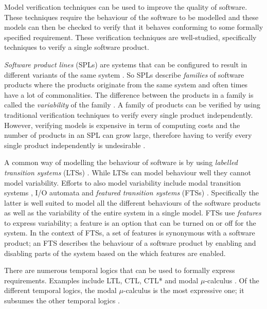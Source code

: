 Model verification techniques can be used to improve the quality of software. These techniques require the behaviour of the software to be modelled and these models can then be checked to verify that it behaves conforming to some formally specified requirement. These verification techniques are well-studied, specifically techniques to verify a single software product.

\textit{Software product lines} (SPLs) are systems that can be configured to result in different variants of the same system \cite{ClementsSoftwareProduct2001,SPLsFoundationAndTechniques}. So SPLs describe \textit{families} of software products where the products originate from the same system and often times have a lot of commonalities. The difference between the products in a family is called the \textit{variability} of the family \cite{OnTheNotionOfVariability}. A family of products can be verified by using traditional verification techniques to verify every single product independently. However, verifying models is expensive in term of computing costs and the number of products in an SPL can grow large, therefore having to verify every single product independently is undesirable \cite{CheckingLotsOfSystems}.

A common way of modelling the behaviour of software is by using \textit{labelled transition systems} (LTSs) \cite{Groote}. While LTSs can model behaviour well they cannot model variability. Efforts to also model variability include  modal transition systems \cite{ModalTS1,ModalTS2,ModalTS3}, I/O automata \cite{ModalIOAutomata,ModelCheckingDomainArtifacts} and \textit{featured transition systems} (FTSs) \cite{CheckingLotsOfSystems,FTSLTL}. Specifically the latter is well suited to model all the different behaviours of the software products as well as the variability of the entire system in a single model. FTSs use \textit{features} to express variability; a feature is an option that can be turned on or off for the system. In the context of FTSs, a set of features is synonymous with a software product; an FTS describes the behaviour of a software product by enabling and disabling parts of the system based on the which features are enabled.

There are numerous temporal logics that can be used to formally express requirements. Examples include LTL, CTL, CTL* and modal $\mu$-calculus \cite{LTL,PrinciplesOfModelChecking,Groote}. Of the different temporal logics, the modal $\mu$-calculus is the most expressive one; it subsumes the other temporal logics \cite{MuCalculusSubsumes}. 

